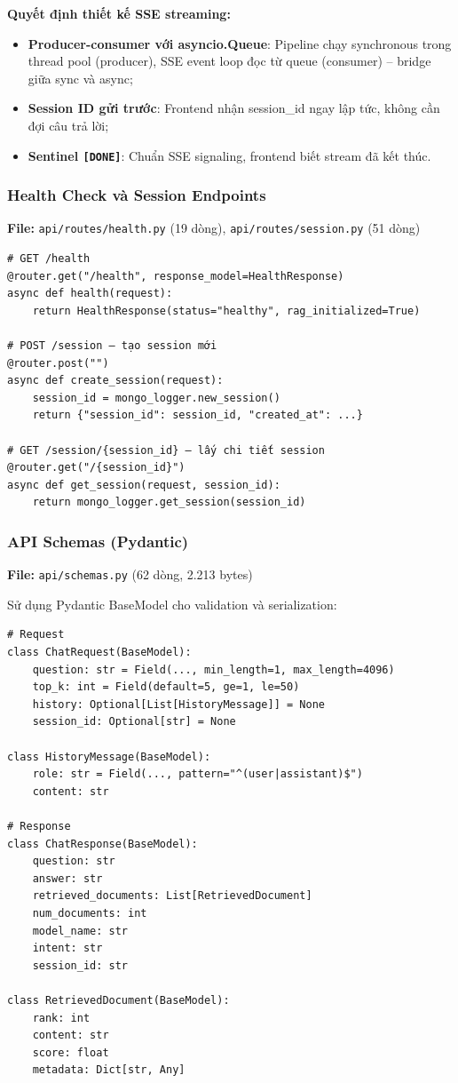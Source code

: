 \documentclass[../DoAn.tex]{subfiles}
\begin{document}
\textbf{Quyết định thiết kế SSE streaming:}
\begin{itemize}
    \item \textbf{Producer-consumer với asyncio.Queue}: Pipeline chạy synchronous trong thread pool (producer), SSE event loop đọc từ queue (consumer) -- bridge giữa sync và async;
    \item \textbf{Session ID gửi trước}: Frontend nhận session\_id ngay lập tức, không cần đợi câu trả lời;
    \item \textbf{Sentinel \texttt{[DONE]}}: Chuẩn SSE signaling, frontend biết stream đã kết thúc.
\end{itemize}

\subsubsection{Health Check và Session Endpoints}
\textbf{File:} \texttt{api/routes/health.py} (19 dòng), \texttt{api/routes/session.py} (51 dòng)

\begin{verbatim}
# GET /health
@router.get("/health", response_model=HealthResponse)
async def health(request):
    return HealthResponse(status="healthy", rag_initialized=True)

# POST /session — tạo session mới
@router.post("")
async def create_session(request):
    session_id = mongo_logger.new_session()
    return {"session_id": session_id, "created_at": ...}

# GET /session/{session_id} — lấy chi tiết session
@router.get("/{session_id}")
async def get_session(request, session_id):
    return mongo_logger.get_session(session_id)
\end{verbatim}

\subsubsection{API Schemas (Pydantic)}
\textbf{File:} \texttt{api/schemas.py} (62 dòng, 2.213 bytes)

Sử dụng Pydantic BaseModel cho validation và serialization:
\begin{verbatim}
# Request
class ChatRequest(BaseModel):
    question: str = Field(..., min_length=1, max_length=4096)
    top_k: int = Field(default=5, ge=1, le=50)
    history: Optional[List[HistoryMessage]] = None
    session_id: Optional[str] = None

class HistoryMessage(BaseModel):
    role: str = Field(..., pattern="^(user|assistant)$")
    content: str

# Response
class ChatResponse(BaseModel):
    question: str
    answer: str
    retrieved_documents: List[RetrievedDocument]
    num_documents: int
    model_name: str
    intent: str
    session_id: str

class RetrievedDocument(BaseModel):
    rank: int
    content: str
    score: float
    metadata: Dict[str, Any]
\end{verbatim}
\end{document}
